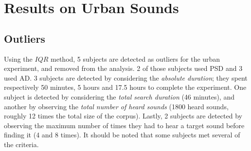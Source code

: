 \documentclass{aes2e}
\begin{document}
\section{Results on Urban Sounds} \label{resultsu}

\subsection{Outliers}

Using the $IQR$ method, 5 subjects are detected as outliers for the urban experiment, and removed from the analysis. 2 of those subjects used PSD and 3 used AD. 3 subjects are detected by considering the \textit{absolute duration}; they spent respectively 50 minutes, 5 hours and 17.5 hours to complete the experiment. One subject is detected by considering the \textit{total search duration} (46 minutes), and another by observing the \textit{total number of heard sounds} (1800 heard sounds, roughly 12 times the total size of the corpus). Lastly, 2 subjects are detected by observing the maximum number of times they had to hear a target sound before finding it (4 and 8 times). It should be noted that some subjects met several of the criteria.
\end{document}
